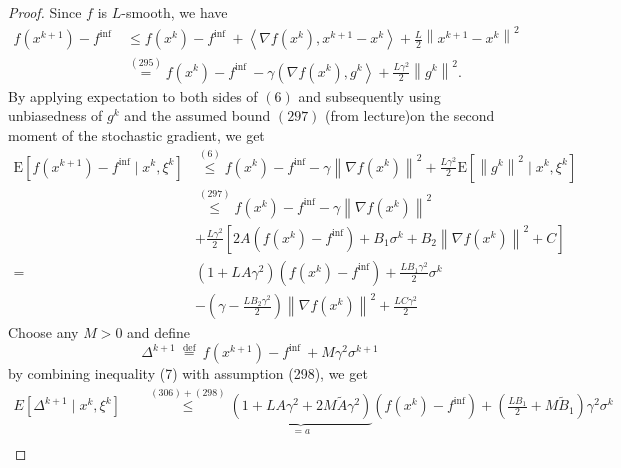 \documentclass[12pt,a4paper]{article}
\begin{document}
	\begin{proof}
		Since $f$ is $L$-smooth, we have
		\begin{equation}
		\begin{aligned}
			f\left(x^{k+1}\right)-f^{\text {inf }} & \leq f\left(x^{k}\right)-f^{\text {inf }}+\left\langle\nabla f\left(x^{k}\right), x^{k+1}-x^{k}\right\rangle+\frac{L}{2}\left\|x^{k+1}-x^{k}\right\|^{2} \\
			& \stackrel{(295)}{=} f\left(x^{k}\right)-f^{\text {inf }}-\gamma\left(\nabla f\left(x^{k}\right), g^{k}\right\rangle+\frac{L \gamma^{2}}{2}\left\|g^{k}\right\|^{2} .
		\end{aligned}
		\end{equation}
		By applying expectation to both sides of $(6)$ and subsequently using unbiasedness of $g^{k}$ and the assumed bound $(297)$ (from lecture)on the second moment of the stochastic gradient, we get
		\begin{equation}
		\begin{aligned}
			\mathrm{E}\left[f\left(x^{k+1}\right)-f^{\mathrm{inf}} \mid x^{k}, \xi^{k}\right] & \stackrel{(6)}{\leq} f\left(x^{k}\right)-f^{\mathrm{inf}}-\gamma\left\|\nabla f\left(x^{k}\right)\right\|^{2}+\frac{L \gamma^{2}}{2} \mathrm{E}\left[\left\|g^{k}\right\|^{2} \mid x^{k}, \xi^{k}\right] \\
			& \stackrel{(297)}{\leq} f\left(x^{k}\right)-f^{\mathrm{inf}}-\gamma\left\|\nabla f\left(x^{k}\right)\right\|^{2} \\
			&+\frac{L \gamma^{2}}{2}\left[2 A\left(f\left(x^{k}\right)-f^{\mathrm{inf}}\right)+B_{1} \sigma^{k}+B_{2}\left\|\nabla f\left(x^{k}\right)\right\|^{2}+C\right] \\
			=&\left(1+L A \gamma^{2}\right)\left(f\left(x^{k}\right)-f^{\mathrm{inf}}\right)+\frac{L B_{1} \gamma^{2}}{2} \sigma^{k} \\
			&-\left(\gamma-\frac{L B_{2} \gamma^{2}}{2}\right)\left\|\nabla f\left(x^{k}\right)\right\|^{2}+\frac{L C \gamma^{2}}{2}
		\end{aligned}
		\end{equation}
	Choose any $M>0$ and define
	\begin{equation}
	\Delta^{k+1} \stackrel{\text { def }}{=} f\left(x^{k+1}\right)-f^{\text {inf }}+M \gamma^{2} \sigma^{k+1}
	\end{equation}
	by combining inequality (7) with assumption (298), we get 
	\begin{equation}
	\begin{aligned} E\left[\Delta^{k+1} \mid x^{k}, \xi^{k}\right]& \quad \stackrel{(306)+(298)}{\leq} \underbrace{\left(1+L A \gamma^{2}+2 M \tilde{A} \gamma^{2}\right)}_{=a}\left(f\left(x^{k}\right)-f^{\mathrm{inf}}\right) +\left(\frac{L B_{1}}{2}+M \tilde{B}_{1}\right) \gamma^{2} \sigma^{k} \\ 

\end{aligned}
\end{equation}
\end{proof}
\end{document}
